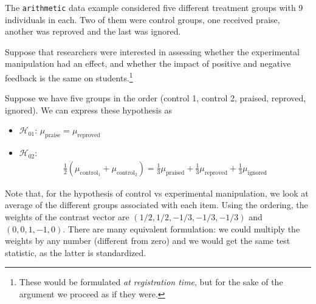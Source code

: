 \documentclass[
  11pt,
  letterpaper,
]{scrbook}
\providecommand{\tightlist}{%
  \setlength{\itemsep}{0pt}\setlength{\parskip}{0pt}}\usepackage{longtable,booktabs,array}
\theoremstyle{definition}
\theoremstyle{remark}
\begin{document}
The \texttt{arithmetic} data example considered five different treatment
groups with 9 individuals in each. Two of them were control groups, one
received praise, another was reproved and the last was ignored.

Suppose that researchers were interested in assessing whether the
experimental manipulation had an effect, and whether the impact of
positive and negative feedback is the same on students.\footnote{These
  would be formulated \emph{at registration time}, but for the sake of
  the argument we proceed as if they were.}

Suppose we have five groups in the order (control 1, control 2, praised,
reproved, ignored). We can express these hypothesis as

\begin{itemize}
\tightlist
\item
  \(\mathscr{H}_{01}\): \(\mu_{\text{praise}} = \mu_{\text{reproved}}\)
\item
  \(\mathscr{H}_{02}\): \begin{align*}
  \frac{1}{2}(\mu_{\text{control}_1}+\mu_{\text{control}_2}) = \frac{1}{3}\mu_{\text{praised}} + \frac{1}{3}\mu_{\text{reproved}} + \frac{1}{3}\mu_{\text{ignored}}
  \end{align*}
\end{itemize}

Note that, for the hypothesis of control vs experimental manipulation,
we look at average of the different groups associated with each item.
Using the ordering, the weights of the contrast vector are
\((1/2, 1/2, -1/3, -1/3, -1/3)\) and \((0, 0, 1, -1, 0)\). There are
many equivalent formulation: we could multiply the weights by any number
(different from zero) and we would get the same test statistic, as the
latter is standardized.
\end{document}
